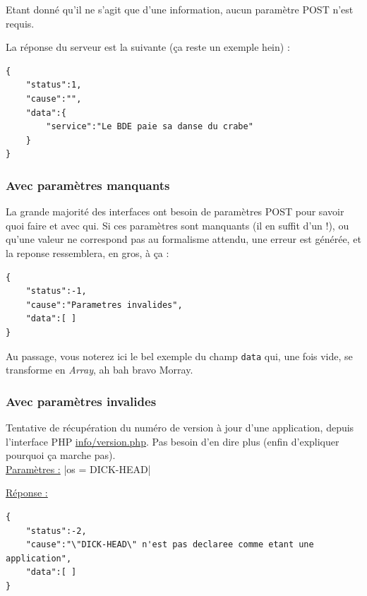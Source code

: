 \documentclass[12pt,a4paper,oneside]{report}
\begin{document}
\noindent Etant donné qu'il ne s'agit que d'une information, aucun paramètre POST n'est requis.

\noindent La réponse du serveur est la suivante (ça reste un exemple hein) :

\begin{verbatim}
{
    "status":1,
    "cause":"",
    "data":{
        "service":"Le BDE paie sa danse du crabe"
    }
}
\end{verbatim}

\subsubsection{Avec paramètres manquants}

La grande majorité des interfaces ont besoin de paramètres POST pour savoir quoi faire et avec qui. Si ces paramètres sont manquants (il en suffit d'un !), ou qu'une valeur ne correspond pas au formalisme attendu, une erreur est générée, et la reponse ressemblera, en gros, à ça :

\begin{verbatim}
{
    "status":-1,
    "cause":"Parametres invalides",
    "data":[ ]
}
\end{verbatim}

\noindent Au passage, vous noterez ici le bel exemple du champ \texttt{data} qui, une fois vide, se transforme en \textit{Array}, ah bah bravo Morray.

\subsubsection{Avec paramètres invalides}

Tentative de récupération du numéro de version à jour d'une application, depuis l'interface PHP \url{info/version.php}. Pas besoin d'en dire plus (enfin d'expliquer pourquoi ça marche pas).\\

\noindent \underline{Paramètres :} |os = DICK-HEAD|

\noindent \underline{Réponse :}

\begin{verbatim}
{
    "status":-2,
    "cause":"\"DICK-HEAD\" n'est pas declaree comme etant une application",
    "data":[ ]
}
\end{verbatim}
\end{document}
